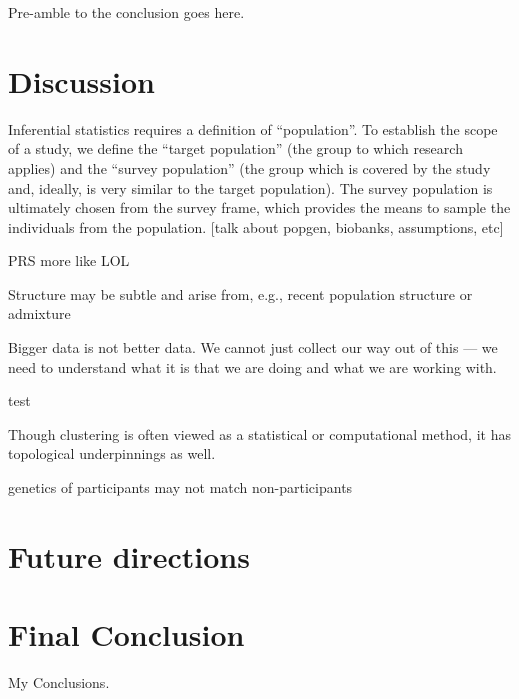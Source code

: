 Pre-amble to the conclusion goes here.

\section{Discussion}

Inferential statistics requires a definition of ``population''\citep{statcan2003}. To establish the scope of a study, we define the ``target population'' (the group to which research applies) and the ``survey population'' (the group which is covered by the study and, ideally, is very similar to the target population). The survey population is ultimately chosen from the survey frame, which provides the means to sample the individuals from the population. [talk about popgen, biobanks, assumptions, etc]

PRS more like LOL\citep{kaplan_polygenic_2022}

Structure may be subtle and arise from, e.g., recent population structure or admixture\citep{gopalan_human_2022}

Bigger data is not better data. We cannot just collect our way out of this --- we need to understand what it is that we are doing and what we are working with.

test\citep{rose_sick_2001}

Though clustering is often viewed as a statistical or computational method, it has topological underpinnings as well.

genetics of participants may not match non-participants
\citep{benonisdottir_studying_2023}

\section{Future directions}

\section{Final Conclusion}
My Conclusions.
